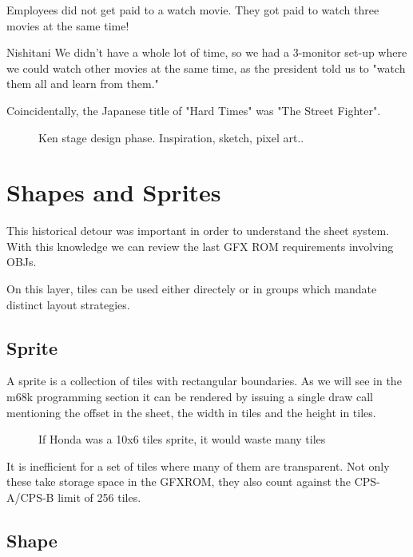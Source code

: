 Employees did not get paid to a watch movie. They got paid to watch three movies at the same time!

\begin{q}{Nishitani\cite{ffdevinterview}}
We didn't have a whole lot of time, so we had a 3-monitor set-up where we could watch other movies at the same time, as the president told us to "watch them all and learn from them."
\end{q}

\begin{trivia}
Coincidentally, the Japanese title of "Hard Times" was "The Street Fighter".
\end{trivia}

 \begin{figure}[H]
\caption*{Ken stage design phase. Inspiration, sketch, pixel art.\cite{sf2completefiles}.}
\end{figure}

\section{Shapes and Sprites}
This historical detour was important in order to understand the sheet system. With this knowledge we can review the last GFX ROM requirements involving OBJs.  

On this layer, tiles can be used either directely or in groups which mandate distinct layout strategies.

\subsection{Sprite}
A sprite is a collection of tiles with rectangular boundaries. As we will see in the m68k programming section it can be rendered by issuing a single draw call mentioning the offset in the sheet, the width in tiles and the height in tiles.

 \begin{figure}[H]
\caption*{If Honda was a 10x6 tiles sprite, it would waste many tiles}
\end{figure}

It is inefficient for a set of tiles where many of them are transparent. Not only these take storage space in the GFXROM, they also count against the CPS-A/CPS-B limit of 256 tiles.

\subsection{Shape}

